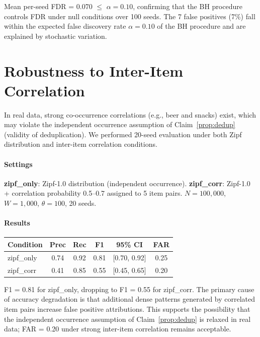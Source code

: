Mean per-seed FDR = 0.070 $\leq$ $\alpha = 0.10$,
confirming that the BH procedure controls FDR under null conditions over 100 seeds.
The 7 false positives (7\%) fall within the expected false discovery rate
$\alpha = 0.10$ of the BH procedure and are explained by stochastic variation.

\section{Robustness to Inter-Item Correlation}\label{app:item_correlation}

In real data, strong co-occurrence correlations (e.g., beer and snacks) exist,
which may violate the independent occurrence assumption of
Claim~\ref{prop:dedup} (validity of deduplication).
We performed 20-seed evaluation under both Zipf distribution and inter-item correlation conditions.

\paragraph{Settings}
\textbf{zipf\_only}: Zipf-1.0 distribution (independent occurrence).
\textbf{zipf\_corr}: Zipf-1.0 + correlation probability 0.5--0.7 assigned to 5 item pairs.
$N=100{,}000$, $W=1{,}000$, $\theta=100$, 20 seeds.

\paragraph{Results}
\begin{center}
\begin{tabular}{lccccc}
\toprule
Condition & Prec & Rec & F1 & 95\% CI & FAR \\
\midrule
zipf\_only & 0.74 & 0.92 & 0.81 & [0.70, 0.92] & 0.25 \\
zipf\_corr & 0.41 & 0.85 & 0.55 & [0.45, 0.65] & 0.20 \\
\bottomrule
\end{tabular}
\end{center}

F1 = 0.81 for zipf\_only, dropping to F1 = 0.55 for zipf\_corr.
The primary cause of accuracy degradation is that additional dense patterns
generated by correlated item pairs increase false positive attributions.
This supports the possibility that the independent occurrence assumption
of Claim~\ref{prop:dedup} is relaxed in real data;
FAR = 0.20 under strong inter-item correlation remains acceptable.

